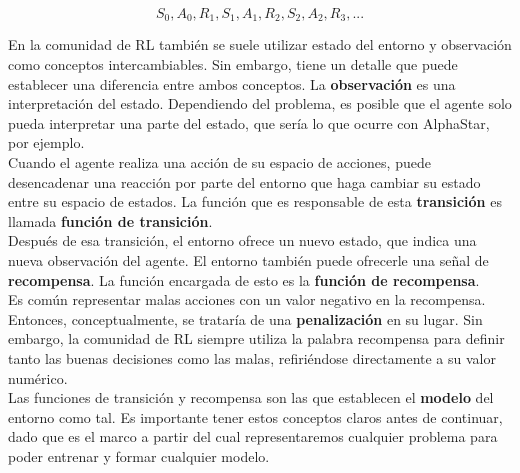 \documentclass[11pt,fleqn]{book} %
\begin{document}
\begin{equation}
S_0, A_0, R_1, S_1, A_1, R_2, S_2, A_2, R_3, ...
\end{equation}

En la comunidad de RL también se suele utilizar estado del entorno y observación como conceptos intercambiables. Sin embargo, tiene un detalle que puede establecer una diferencia entre ambos conceptos. La \textbf{observación} es una interpretación del estado. Dependiendo del problema, es posible que el agente solo pueda interpretar una parte del estado, que sería lo que ocurre con AlphaStar, por ejemplo.\cite{article:vinyals} \cite{article:vinyals2} \\

Cuando el agente realiza una acción de su espacio de acciones, puede desencadenar una reacción por parte del entorno que haga cambiar su estado entre su espacio de estados. La función que es responsable de esta \textbf{transición} es llamada \textbf{función de transición}. \\

Después de esa transición, el entorno ofrece un nuevo estado, que indica una nueva observación del agente. El entorno también puede ofrecerle una señal de \textbf{recompensa}. La función encargada de esto es la \textbf{función de recompensa}. \\

Es común representar malas acciones con un valor negativo en la recompensa. Entonces, conceptualmente, se trataría de una \textbf{penalización} en su lugar. Sin embargo, la comunidad de RL siempre utiliza la palabra recompensa para definir tanto las buenas decisiones como las malas, refiriéndose directamente a su valor numérico. \\

Las funciones de transición y recompensa son las que establecen el \textbf{modelo} del entorno como tal. Es importante tener estos conceptos claros antes de continuar, dado que es el marco a partir del cual representaremos cualquier problema para poder entrenar y formar cualquier modelo. \\

\end{document}

